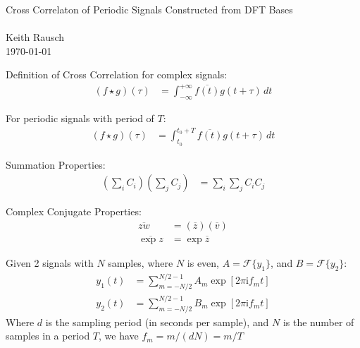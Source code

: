 \documentclass[12pt]{article}
\newenvironment{given}[1][Given]{\begin{trivlist}
\item[\hskip \labelsep {\bfseries #1:}\hskip \labelsep ]}{\end{trivlist}}
\begin{document}
\hfill {\Large \center Cross Correlaton of Periodic Signals Constructed from DFT Bases} \\
\\
\noindent Keith Rausch \\
\hfill \today \\

\newcommand\twopi{2 \pi}
\newcommand\twopii{\twopi \mathrm{i}}
\newcommand\pii{\pi \mathrm{i}}

\begin{given}{} 
Definition of Cross Correlation for complex signals:
\begin{align}
(f \star g)(\tau) & = \int_{-\infty}^{+\infty} \overline{f(t)} g(t+\tau) \,dt
\end{align}

For periodic signals with period of $T$:
\begin{align}
(f \star g)(\tau) & = \int_{t_0}^{t_0+T} \overline{f(t)} g(t+\tau) \,dt
\end{align}

Summation Properties:
\begin{align}
\left( \sum_{i} C_i \right) \left( \sum_{j} C_j \right) & = \sum_{i} \sum_{j} C_i C_j
\end{align}

Complex Conjugate Properties:
\begin{align}
\overline{zw} & = (\overline{z}) (\overline{v}) \\
\overline{ \exp{z}} & = \exp{\overline{z}}
\end{align}

Given 2 signals with $N$ samples, where $N$ is even, $A  = \mathcal{F}\{y_1\}$, and $B  = \mathcal{F}\{y_2\}$:
\begin{align}
y_1(t) & = \sum_{m = -N/2}^{N/2-1} A_m \exp{[\twopii f_m t]} \\
y_2(t) & = \sum_{m = -N/2}^{N/2-1} B_m \exp{[\twopii f_m t]}
\end{align}
Where $d$ is the sampling period (in seconds per sample), and $N$ is the number of samples in a period $T$, we have $f_m = m/(dN) = m/T$
\end{given}


\end{document}
